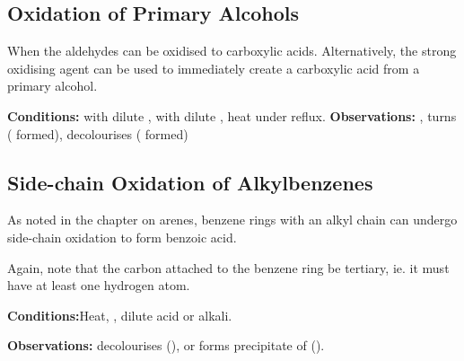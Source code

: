 		\subsection{Oxidation of Primary Alcohols}

			When the aldehydes can be oxidised to carboxylic acids. Alternatively, the strong oxidising agent  can be used to
			immediately create a carboxylic acid from a primary alcohol.

			\vspace{1.5em}
			\vbox{\textbf{Conditions:}	\tabto{35mm} with dilute ,   with dilute ,
										\tabto{35mm}heat under reflux.}
			\vspace{0.75em}
			\vbox{\textbf{Observations:}\tabto{35mm} , turns 
													( formed), 
										\tabto{35mm}  decolourises ( formed)}





		\pagebreak
		\subsection{Side-chain Oxidation of Alkylbenzenes}

			As noted in the chapter on arenes, benzene rings with an alkyl chain can undergo side-chain oxidation to form benzoic acid.

			Again, note that the carbon attached to the benzene ring  be tertiary, ie. it must have at least one hydrogen atom.


			\vspace{1.5em}

			\vbox{\textbf{Conditions:}\tabto{35mm}Heat, , dilute acid or alkali.}

			\vspace{0.75em}
			\vbox{\textbf{Observations:}\tabto{35mm}  decolourises (), or
										\tabto{35mm}forms  precipitate of  ().}

